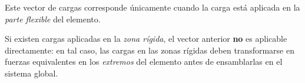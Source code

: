 \vspace{1cm} 
\begin{tcolorbox}[colback=green!5!white, colframe=green!75!black,
                  title=\textbf{Nota}]
Este vector de cargas corresponde únicamente cuando la carga está aplicada en la 
\emph{parte flexible} del elemento. 

Si existen cargas aplicadas en la \emph{zona rígida}, el vector anterior \textbf{no} 
es aplicable directamente: en tal caso, las cargas en las zonas rígidas deben 
transformarse en fuerzas equivalentes en los \emph{extremos} del elemento antes de 
ensamblarlas en el sistema global.
\end{tcolorbox}


